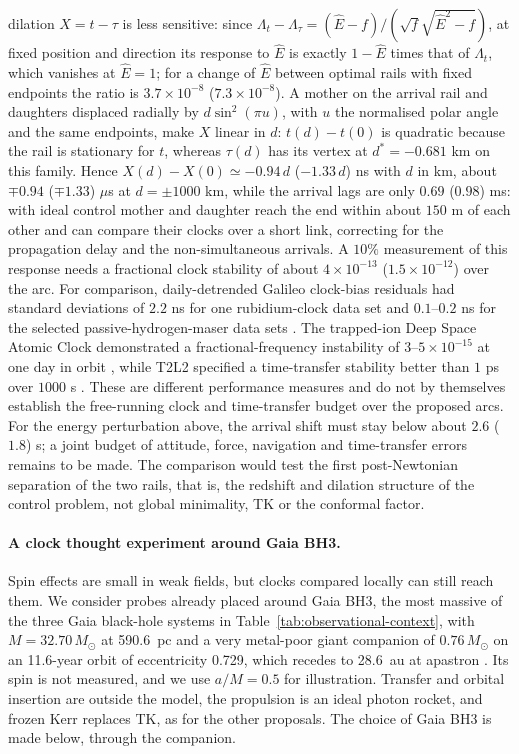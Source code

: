 \documentclass[12pt]{iopart}
\theoremstyle{plain}
\theoremstyle{definition}
\theoremstyle{remark}
\newcommand{\Ehat}{\hat E}
\begin{document}
dilation $X=t-\tau$ is less sensitive: since
$\Lambda_t-\Lambda_\tau=(\Ehat-f)/(\sqrt f\sqrt{\Ehat^2-f})$, at fixed position and
direction its response to $\Ehat$ is exactly $1-\Ehat$ times that of $\Lambda_t$, which
vanishes at $\Ehat=1$; for a change of $\Ehat$ between optimal rails with fixed endpoints
the ratio is $3.7\times10^{-8}$ ($7.3\times10^{-8}$). A mother on the arrival rail and
daughters displaced radially by $d\sin^2(\pi u)$, with $u$ the normalised polar angle
and the same endpoints, make $X$ linear in $d$: $t(d)-t(0)$ is quadratic because the
rail is stationary for $t$, whereas $\tau(d)$ has its vertex at $d^*=-0.681$ km on this
family. Hence $X(d)-X(0)\simeq-0.94\,d$ ($-1.33\,d$) ns with $d$ in km, about
$\mp0.94$ ($\mp1.33$) $\mu$s at $d=\pm1000$ km, while the arrival lags are only
$0.69$ ($0.98$) ms: with ideal control mother and daughter reach the end within about
$150$ m of each other and can compare their clocks over a short link, correcting for
the propagation delay and the non-simultaneous arrivals. A $10\%$ measurement of this
response needs a fractional clock stability of about $4\times10^{-13}$
($1.5\times10^{-12}$) over the arc. For comparison, daily-detrended Galileo clock-bias
residuals had standard deviations of $2.2$ ns for one rubidium-clock data set and
$0.1$--$0.2$ ns for the selected passive-hydrogen-maser data sets \cite{Delva2018}. The
trapped-ion Deep Space Atomic Clock demonstrated a fractional-frequency instability of
$3$--$5\times10^{-15}$ at one day in orbit \cite{Burt2021}, while T2L2 specified a
time-transfer stability better than $1$ ps over $1000$ s \cite{Samain2014}. These are
different performance measures and do not by themselves establish the free-running clock
and time-transfer budget over the proposed arcs. For the
energy perturbation above, the arrival shift must stay below about $2.6$ ($1.8$) s; a
joint budget of attitude, force, navigation and
time-transfer errors remains to be made. The comparison would test the first
post-Newtonian separation of the two rails, that is, the redshift and dilation
structure of the control problem, not global minimality, TK or the conformal factor.

\paragraph{A clock thought experiment around Gaia BH3.}
\label{par:obs-kerr-thought}
Spin effects are small in weak fields, but clocks compared locally can still reach them.
We consider probes already placed around Gaia BH3, the most massive of the three Gaia
black-hole systems in Table~\ref{tab:observational-context}, with $M=32.70\,M_\odot$ at 590.6~pc and a very
metal-poor giant companion of $0.76\,M_\odot$ on an 11.6-year orbit of eccentricity 0.729,
which recedes to 28.6~au at apastron \cite{Gaia2024BH3}. Its spin is not measured, and we use
$a/M=0.5$ for illustration. Transfer and orbital insertion are outside the model, the
propulsion is an ideal photon rocket, and frozen Kerr replaces TK, as for the other
proposals. The choice of Gaia BH3 is made below, through the companion.
\end{document}
